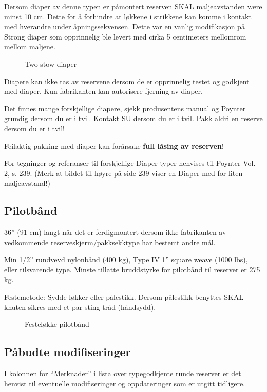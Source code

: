 Dersom diaper av denne typen er påmontert reserven SKAL maljeavstanden være minst 10 cm. Dette for å forhindre at løkkene i strikkene kan komme i kontakt med hverandre under åpningssekvensen. Dette var en vanlig modifikasjon på Strong diaper som opprinnelig ble levert med cirka 5 centimeters mellomrom mellom maljene.

\begin{figure}
	\caption{Two-stow diaper}
\end{figure}

Diapere kan ikke tas av reservene dersom de er opprinnelig testet og godkjent med diaper. Kun fabrikanten kan autorisere fjerning av diaper.

Det finnes mange forskjellige diapere, sjekk produsentens manual og Poynter grundig dersom du er i tvil. Kontakt SU dersom du er i tvil. Pakk aldri en reserve dersom du er i tvil!

Feilaktig pakking med diaper kan forårsake \textbf{full låsing av reserven}!

For tegninger og referanser til forskjellige Diaper typer henvises til Poynter Vol. 2, s. 239. (Merk at bildet til høyre på side 239 viser en Diaper med for liten maljeavstand!)

\subsection{Pilotbånd}
36'' (91 cm) langt når det er ferdigmontert dersom ikke fabrikanten av vedkommende reserveskjerm/pakksekktype har bestemt andre mål.

Min 1/2'' rundvevd nylonbånd (400 kg), Type IV 1'' square weave (1000 lbs), eller tilsvarende type. Minste tillatte bruddstyrke for pilotbånd til reserver er 275 kg.

Festemetode: Sydde løkker eller pålestikk. Dersom pålestikk benyttes SKAL knuten sikres med et par sting tråd (håndsydd).

\begin{figure}
	\caption{Festeløkke pilotbånd}
\end{figure}

\subsection{Påbudte modifiseringer}
I kolonnen for ``Merknader'' i lista over typegodkjente runde reserver er det henvist til eventuelle modifiseringer og oppdateringer som er utgitt tidligere.

